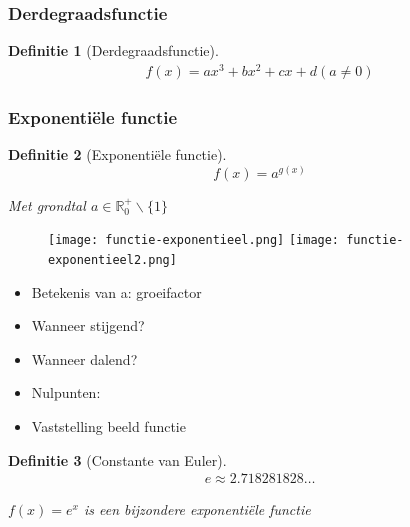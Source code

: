 \documentclass{article}
\newtheorem{theorem}{Definitie}[section]
\begin{document}
\subsubsection{Derdegraadsfunctie}

\begin{theorem}[Derdegraadsfunctie]
\begin{equation}
    \begin{aligned}
        f(x) = ax^3 + bx^2 + cx + d
        (a \neq 0)
    \end{aligned}
\end{equation}


\end{theorem}

\subsubsection{Exponentiële functie}

\begin{theorem}[Exponentiële functie]
\begin{equation}
    f(x) = a^{g(x)}
\end{equation}

Met grondtal $a \in \mathbb{R}_0^+ \backslash \{1\}$
\end{theorem}

\begin{figure}[H]
    \centering
    \texttt{[image: functie-exponentieel.png]}
    \texttt{[image: functie-exponentieel2.png]}
\end{figure}


\begin{itemize}
    \item Betekenis van a: groeifactor
    \item Wanneer stijgend? 
    \item Wanneer dalend? 
    \item Nulpunten: 
    \item Vaststelling beeld functie
\end{itemize}



\begin{theorem}[Constante van Euler]

\begin{equation}
    \begin{aligned}
        e \approx 2.718281828\dots
    \end{aligned}
\end{equation}

$f(x) = e^x$ is een bijzondere exponentiële functie
\end{theorem}
\end{document}

